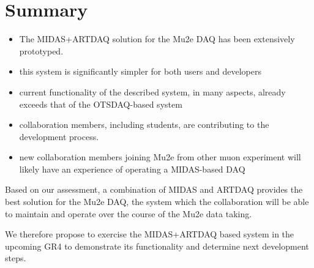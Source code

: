 \section {Summary}

\begin{itemize}
\item 
  The MIDAS+ARTDAQ solution for the Mu2e DAQ has been extensively prototyped.
\item
  this system is significantly simpler for both users and developers
\item
  current functionality of the described system, in many aspects,
  already exceeds that of the OTSDAQ-based system  
\item
  collaboration members, including students, are contributing
  to the development process. 
\item
  new collaboration members joining Mu2e from other muon experiment will
  likely have an experience of operating a MIDAS-based DAQ
\end{itemize}

Based on our assessment, a combination of MIDAS and  ARTDAQ provides
the best solution for the Mu2e DAQ,  the system which the collaboration
will be able to maintain and operate over the course of the Mu2e data taking.

\vspace{0.2in}
We therefore propose to exercise the MIDAS+ARTDAQ based system in the upcoming GR4
to demonstrate its functionality and determine next development steps. 

